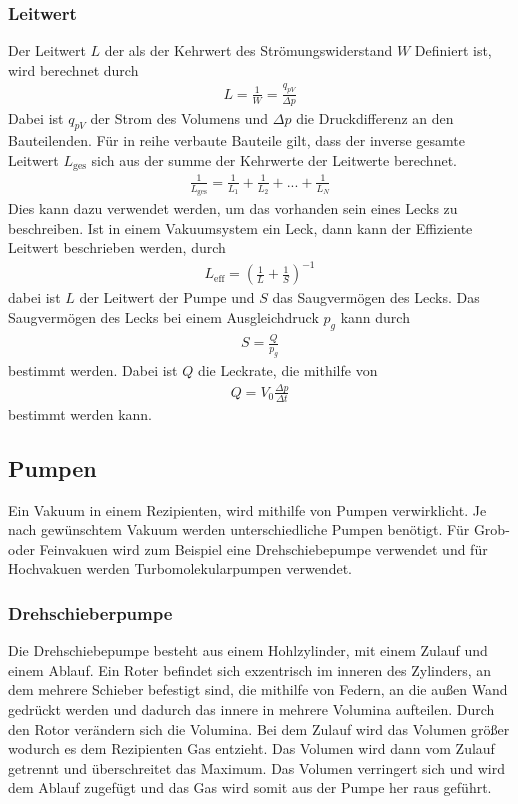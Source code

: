 \subsubsection{Leitwert}
Der Leitwert $L$ der als der Kehrwert des Strömungswiderstand $W$ Definiert ist, wird berechnet durch
\begin{align}
L=\frac{1}{W} = \frac{q_{pV}}{\Delta p}
\end{align}
Dabei ist $q_{pV}$ der Strom des Volumens und $\Delta p$ die Druckdifferenz an den Bauteilenden. Für in reihe verbaute Bauteile  gilt, dass der inverse gesamte Leitwert $L_\text{ges}$ sich aus der summe der Kehrwerte der Leitwerte berechnet.
 \begin{align}
 \frac{1}{L_\text{ges}}=\frac{1}{L_1}+\frac{1}{L_2}+...+\frac{1}{L_N}
 \end{align}
Dies kann dazu verwendet werden, um das vorhanden sein eines Lecks zu beschreiben. Ist in einem Vakuumsystem ein Leck, dann kann der Effiziente Leitwert beschrieben werden, durch
\begin{align}
L_\text{eff}=\left(\frac{1}{L} + \frac{1}{S}  \right)^{-1}
\label{eq:Leitwert_Reihenschaltung}
\end{align}
dabei ist $L$ der Leitwert der Pumpe und $S$ das Saugvermögen des Lecks. Das Saugvermögen des Lecks bei einem Ausgleichdruck $p_g$ kann durch 
\begin{align}
S=\frac{Q}{p_g}
\label{eq:Saugvermoegen_Leckrate}
\end{align}
bestimmt werden. Dabei ist $Q$ die Leckrate, die mithilfe von 
\begin{align}
Q = V_0 \frac{\Delta p}{\Delta t}
\label{eq:Leckrate}
\end{align}
bestimmt werden kann.
 
\subsection{Pumpen}
Ein Vakuum in einem Rezipienten, wird mithilfe von Pumpen verwirklicht. Je nach gewünschtem Vakuum werden unterschiedliche Pumpen benötigt. Für Grob- oder Feinvakuen wird zum Beispiel eine Drehschiebepumpe verwendet und für Hochvakuen werden Turbomolekularpumpen verwendet.
\subsubsection{Drehschieberpumpe}
Die Drehschiebepumpe besteht aus einem Hohlzylinder, mit einem Zulauf und einem Ablauf. Ein Roter befindet sich exzentrisch im inneren des Zylinders, an dem mehrere Schieber befestigt sind, die mithilfe von Federn, an die außen Wand gedrückt werden und dadurch das innere in mehrere Volumina aufteilen. Durch den Rotor verändern sich die Volumina. Bei dem Zulauf wird das Volumen größer wodurch es dem Rezipienten Gas entzieht. Das Volumen wird dann vom Zulauf getrennt und überschreitet das Maximum. Das Volumen verringert sich  und wird dem Ablauf zugefügt und das Gas wird somit aus der Pumpe her raus geführt.

